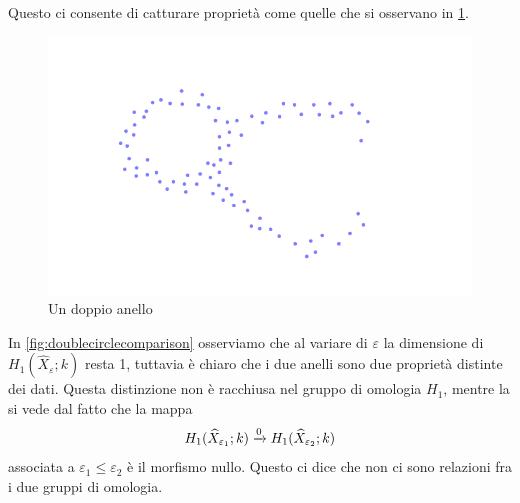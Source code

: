 Questo ci consente di catturare proprietà come quelle che si osservano in \cref{fig:doublecircle}.

\begin{figure}[ht]
  \begin{center}
    \includegraphics{gfx/double_circle_small.pdf}
    \caption{Un doppio anello}
    \label{fig:doublecircle}
  \end{center}
\end{figure}

In \cref{fig:doublecirclecomparison} osserviamo che al variare di $\varepsilon$ la dimensione di $H_1(\widehat{X}_\varepsilon;k)$ resta 1, tuttavia è chiaro che i due anelli sono due proprietà distinte dei dati. Questa distinzione non è racchiusa nel gruppo di omologia $H_1$, mentre la si vede dal fatto che la mappa
\begin{equation*}
H_1(\widehat{X}_{\varepsilon_1};k)\xrightarrow{0}H_1(\widehat{X}_{\varepsilon_2};k)
\end{equation*}
associata a $\varepsilon_1\leq\varepsilon_2$ è il morfismo nullo. Questo ci dice che non ci sono relazioni fra i due gruppi di omologia.

